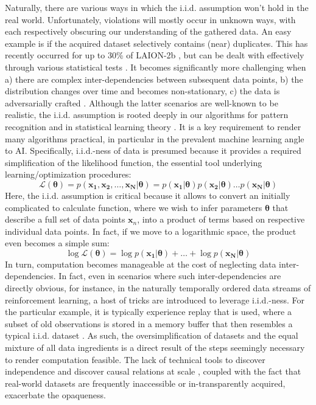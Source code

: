 \documentclass[manuscript,screen,authorversion,nonacm]{acmart}
\begin{document}
Naturally, there are various ways in which the i.i.d. assumption won't hold in the real world. Unfortunately, violations will mostly occur in unknown ways, with each respectively obscuring our understanding of the gathered data. 
An easy example is if the acquired dataset selectively contains (near) duplicates. This has recently occurred for up to 30\% of LAION-2b \cite{Webster2023deduplication}, but can be dealt with effectively through various statistical tests \cite{Hutter2022testingindependenceexchangeablerandom}. It becomes significantly more challenging when a) there are complex inter-dependencies between subsequent data points, b) the distribution changes over time and becomes non-stationary, c) the data is adversarially crafted \cite{darrell2024machine}. 
Although the latter scenarios are well-known to be realistic, the i.i.d. assumption is rooted deeply in our algorithms for pattern recognition and in statistical learning theory \cite{vapnik199learningtheory}. It is a key requirement to render many algorithms practical, in particular in the prevalent machine learning angle to AI. Specifically, i.i.d.-ness of data is presumed because it provides a required simplification of the likelihood function, the essential tool underlying learning/optimization procedures:
\begin{equation}
    \mathcal{L}(\mathbf{\theta}) = p(\mathbf{x_1},\mathbf{x_2},\ldots,\mathbf{x_N}|\mathbf{\theta}) = p(\mathbf{x_1}|\mathbf{\theta})p(\mathbf{x_2}|\mathbf{\theta}) \ldots p(\mathbf{x_N}|\mathbf{\theta}) 
\end{equation}
Here, the i.i.d. assumption is critical because it allows to convert an initially complicated to calculate function, where we wish to infer parameters $\mathbf{\theta}$ that describe a full set of data points $\mathbf{x}_n$, into a product of terms based on respective individual data points. In fact, if we move to a logarithmic space, the product even becomes a simple sum:
\begin{equation}\label{eq:empirical_loss}
    \log \mathcal{L}(\mathbf{\theta}) =\log p(\mathbf{x_1}|\mathbf{\theta}) + \ldots + \log p(\mathbf{x_N}|\mathbf{\theta})
\end{equation}
In turn, computation becomes manageable at the cost of neglecting data inter-dependencies. In fact, even in scenarios where such inter-dependencies are directly obvious, for instance, in the naturally temporally ordered data streams of reinforcement learning, a host of tricks are introduced to leverage i.i.d.-ness. For the particular example, it is typically experience replay that is used, where a subset of old observations is stored in a memory buffer that then resembles a typical i.i.d. dataset \cite{Rolnick2019ExperienceREplay}. As such, the oversimplification of datasets and the equal mixture of all data ingredients is a direct result of the steps seemingly necessary to render computation feasible. The lack of technical tools to discover independence and discover causal relations at scale \cite{Scholkopfetal21}, coupled with the fact that real-world datasets are frequently inaccessible or in-transparently acquired, exacerbate the opaqueness. \\
\end{document}
